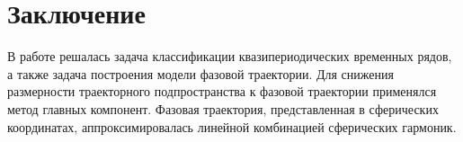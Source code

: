 \documentclass[12pt,twoside]{article}
\begin{document}





\section{Заключение}

В работе решалась задача классификации квазипериодических временных рядов, а также задача построения модели фазовой траектории.
Для снижения размерности траекторного подпространства к фазовой траектории применялся метод главных компонент.
Фазовая траектория, представленная в сферических координатах, аппроксимировалась линейной комбинацией сферических гармоник.
\end{document}
